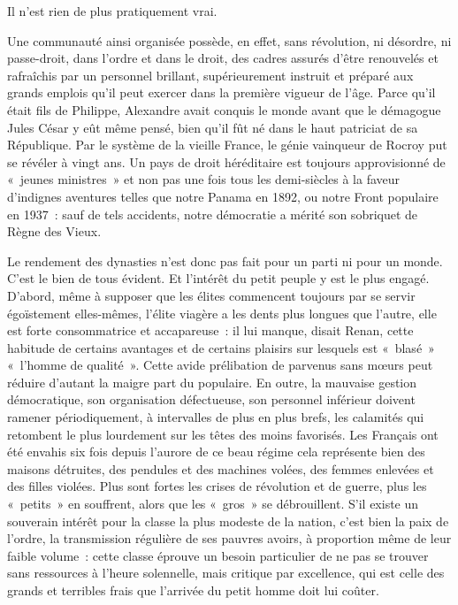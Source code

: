 \documentclass[french,twoside]{book} %
\begin{document}
Il n’est rien de plus pratiquement vrai.\par
Une communauté ainsi organisée possède, en effet, sans révolution, ni désordre, ni passe-droit, dans l’ordre et dans le droit, des cadres assurés d’être renouvelés et rafraîchis par un personnel brillant, supérieurement instruit et préparé aux grands emplois qu’il peut exercer dans la première vigueur de l’âge. Parce qu’il était fils de Philippe, Alexandre avait conquis le monde avant que le démagogue Jules César y eût même pensé, bien qu’il fût né dans le haut patriciat de sa République. Par le système de la vieille France, le génie vainqueur de Rocroy put se révéler à vingt ans. Un pays de droit héréditaire est toujours approvisionné de « jeunes ministres » et non pas une fois tous les demi-siècles à la faveur d’indignes aventures telles que notre Panama en 1892, ou notre Front populaire en 1937 : sauf de tels accidents, notre démocratie a mérité son sobriquet de Règne des Vieux.\par
Le rendement des dynasties n’est donc pas fait pour un parti ni pour un monde. C’est le bien de tous évident. Et l’intérêt du petit peuple y est le plus engagé. D’abord, même à supposer que les élites commencent toujours par se servir égoïstement elles-mêmes, l’élite viagère a les dents plus longues que l’autre, elle est forte consommatrice et accapareuse : il lui manque, disait Renan, cette habitude de certains avantages et de certains plaisirs sur lesquels est « blasé » « l’homme de qualité ». Cette avide prélibation de parvenus sans mœurs peut réduire d’autant la maigre part du populaire. En outre, la mauvaise gestion démocratique, son organisation défectueuse, son personnel inférieur doivent ramener périodiquement, à intervalles de plus en plus brefs, les calamités qui retombent le plus lourdement sur les têtes des moins favorisés. Les Français ont été envahis six fois depuis l’aurore de ce beau régime cela représente bien des maisons détruites, des pendules et des machines volées, des femmes enlevées et des filles violées. Plus sont fortes les crises de révolution et de guerre, plus les « petits » en souffrent, alors que les « gros » se débrouillent. S’il existe un souverain intérêt pour la classe la plus modeste de la nation, c’est bien la paix de l’ordre, la transmission régulière de ses pauvres avoirs, à proportion même de leur faible volume : cette classe éprouve un besoin particulier de ne pas se trouver sans ressources à l’heure solennelle, mais critique par excellence, qui est celle des grands et terribles frais que l’arrivée du petit homme doit lui coûter.\par
\end{document}

